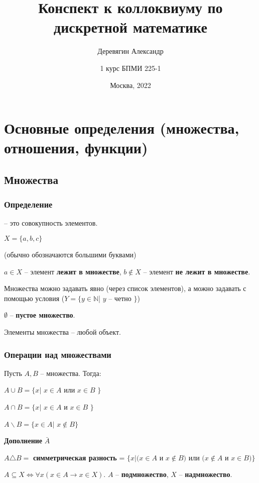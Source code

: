 \documentclass[openany]{article}
\date{Москва, 2022}
\title{Конспект к коллоквиуму по дискретной математике}
\author{Деревягин Александр \and{1 курс БПМИ 225-1}}
\newcommand{\N} {\mathbb{N}}
\begin{document}
   \maketitle
   \tableofcontents
   \newpage

   \section{Основные определения (множества, отношения, функции)}

   \subsection{Множества}

   \subsubsection{Определение}

   {} -- это совокупность элементов.

   $X = \{a, b, c\}$

   (обычно обозначаются большими буквами)

   $a \in X$ -- элемент \textbf{лежит в множестве}, $b \notin X$ -- элемент \textbf{не лежит в множестве}.

   Множества можно задавать явно (через список элементов), а можно задавать с помощью условия ($Y = \{ y \in \N$| $y$ -- четно $\}$)

   $\emptyset$ -- \textbf{пустое множество}.

   Элементы множества -- любой объект.

   \subsubsection{Операции над множествами}

   Пусть $A, B$ -- множества. Тогда:

   $A \cup B = \{x |$ $x \in A$ или $x \in B$ $\}$

   $A \cap B = \{x |$ $x \in A$ и $x \in B$ $\}$

   $A \backslash B = \{x \in A |$ $x \notin B \}$

   \textbf{Дополнение} $\bar{A}$

   $A \triangle B =$ \textbf{симметрическая разность} = $\{x | (x \in A$ и $x \notin B)$ или $(x \notin A$ и $x \in B) \}$

   $A \subseteq X \Leftrightarrow \forall x (x \in A \rightarrow x \in X)$. $A$ -- \textbf{подмножество}, $X$ -- \textbf{надмножество}.
\end{document}
